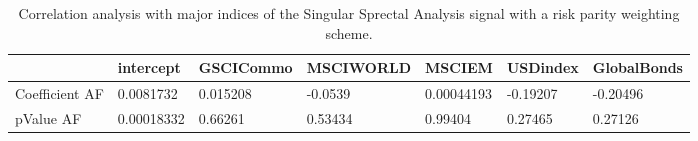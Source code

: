\begin{table}[H]
\centering
\begin{tabular}{lllllll}
\hline& intercept & GSCICommo & MSCIWORLD & MSCIEM & USDindex & GlobalBonds \\ 
\hline 
Coefficient AF & 0.0081732 & 0.015208 & -0.0539 & 0.00044193 & -0.19207 & -0.20496 \\ 
pValue AF & 0.00018332 & 0.66261 & 0.53434 & 0.99404 & 0.27465 & 0.27126 \\ 
\hline
\end{tabular}
\caption{Correlation analysis with major indices of the Singular Sprectal Analysis signal with a risk parity weighting scheme.}
\label{SSA_RP_AFACTOR}
\end{table}
